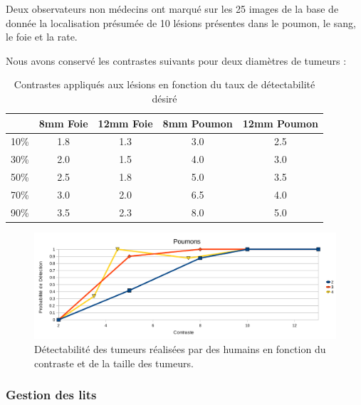 Deux observateurs non médecins ont marqué sur les 25 images de la base de donnée la localisation présumée de 10 lésions présentes dans le poumon, le sang, le foie et la rate.

Nous avons conservé les contrastes suivants pour deux diamètres de tumeurs :



\begin{table}

\centering

\begin{tabular}{|c||c|c||c|c|}
 \hline
	& 8mm Foie	& 12mm Foie	& 8mm Poumon	& 12mm Poumon	\\
\hline
10\%	& 1.8		& 1.3		& 3.0		& 2.5		\\
\hline
30\%	& 2.0		& 1.5		& 4.0		& 3.0		\\
\hline
50\%	& 2.5		& 1.8		& 5.0		& 3.5		\\
\hline
70\%	& 3.0		& 2.0		& 6.5		& 4.0		\\
\hline
90\%	& 3.5		& 2.3		& 8.0		& 5.0		\\
\hline
\end{tabular}
\caption[Contraste final lésions du foie]{Contrastes appliqués aux lésions en fonction du taux de détectabilité désiré}
\label{tab:contrasteFoieFinal}
\end{table}



\begin{figure}[h!]
\begin{center}
\includegraphics[width=15cm]{images/calibration}
\end{center}
\caption{Détectabilité des tumeurs réalisées par des humains en fonction du contraste et de la taille des tumeurs.} 
\label{fig:calibration}
\end{figure}


\subsubsection{Gestion des lits}

